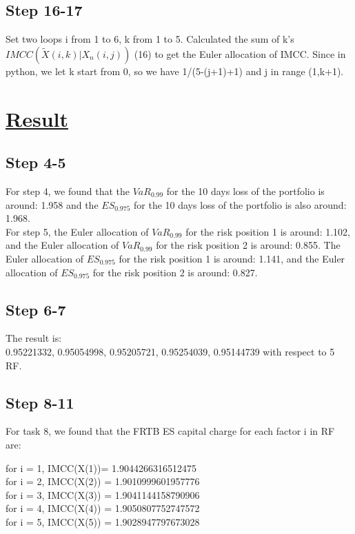 \documentclass{article}
\begin{document}
\subsection*{Step 16-17}
Set two loops i from 1 to 6, k from 1 to 5. Calculated the sum of k's $IMCC(\tilde X(i,k)|X_n(i,j))$ (16) to get the Euler allocation of IMCC. Since in python, we let k start from 0, so we have 1/(5-(j+1)+1) and j in range (1,k+1). 
\section*{\underline{Result}}

\subsection*{Step 4-5}
For step 4, we found that the $VaR_{0.99}$ for the 10 days loss of the portfolio is around: 1.958 and the $ES_{0.975}$ for the 10 days loss of the portfolio is also around: 1.968.
\\For step 5, the Euler allocation of $VaR_{0.99}$ for the risk position 1 is around: 1.102, and the Euler allocation of $VaR_{0.99}$ for the risk position 2 is around: 0.855. The Euler allocation of $ES_{0.975}$ for the risk position 1 is around: 1.141, and the Euler allocation of $ES_{0.975}$ for the risk position 2 is around: 0.827.
\subsection*{Step 6-7}
The result is:\\
0.95221332, 0.95054998, 0.95205721, 0.95254039, 0.95144739 with respect to 5 RF.

\subsection*{Step 8-11}
For task 8, we found that the FRTB ES capital charge for each factor i in RF are:

\noindent for i = 1, IMCC(X(1))= 1.9044266316512475\\
for i = 2, IMCC(X(2))  = 1.9010999601957776\\
for i = 3, IMCC(X(3))  = 1.9041144158790906\\
for i = 4, IMCC(X(4))  = 1.9050807752747572\\
for i = 5, IMCC(X(5))  = 1.9028947797673028\\
\end{document}
